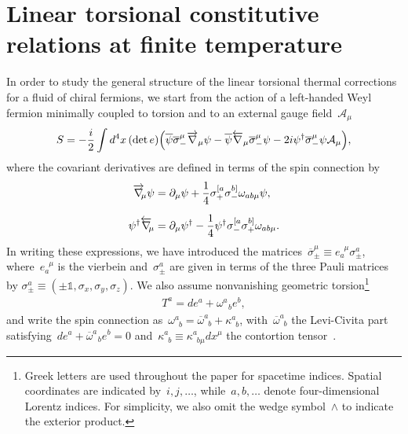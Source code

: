 \documentclass[11pt,a4paper]{article}
\begin{document}
\section{Linear torsional constitutive relations at finite temperature}
\label{sec:general_analysis}

In order to study the general structure of the linear torsional thermal corrections 
for a fluid of chiral fermions,
we start from the action of a left-handed Weyl fermion 
minimally coupled to torsion and to an external gauge field~$\mathcal{A}_{\mu}$~\cite{Freedman:2012zz}
\begin{align}
S=-{i\over 2}\int d^{4}x\,(\det{e})\Big(\overline{\psi}\overline{\sigma}_{-}^{\mu}
\overrightarrow{\nabla}_{\mu}\psi
-\overline{\psi}\overleftarrow{\nabla}_{\mu}\overline{\sigma}^{\mu}_{-}\psi
-2i\psi^{\dagger}\overline{\sigma}_{-}^{\mu}\psi\mathcal{A}_{\mu}\Big),
\label{eqw:action_full}
\end{align}
where the covariant derivatives are defined in terms of the spin connection by
\begin{align}
\overrightarrow{\nabla}_{\!\!\mu}\psi&=\partial_{\mu}\psi+{1\over 4}
\sigma_{+}^{[a}\sigma_{-}^{b]}\omega_{ab\mu}\psi,\nonumber \\[0.2cm]
\psi^{\dagger}\overleftarrow{\nabla}_{\!\!\mu}&=\partial_{\mu}\psi^{\dagger}
-{1\over 4}\psi^{\dagger}\sigma_{-}^{[a}\sigma_{+}^{b]}\omega_{ab\mu}.
\label{eq:right_left_derivs}
\end{align}
In writing these expressions, we have introduced the 
matrices~$\overline{\sigma}^{\mu}_{\pm}\equiv e_{a}^{\,\,\,\mu}\sigma^{a}_{\pm}$, 
where~$e_{a}^{\,\,\,\mu}$ is the vierbein 
and~$\sigma_{\pm}^{a}$ are given in terms of the three Pauli matrices by
$\sigma_{\pm}^{a}\equiv(\pm\mathbb{1},\sigma_{x},\sigma_{y},\sigma_{z})$. 
We also assume nonvanishing geometric torsion\footnote{Greek letters are used throughout the 
paper for spacetime indices. Spatial coordinates are indicated by~$i,j,\ldots$, while~$a,b,\ldots$
denote four-dimensional Lorentz indices.  For simplicity, we
also omit the wedge symbol~$\wedge$ to indicate the exterior product.} 
\begin{align}
T^{a}=de^{a}+\omega^{a}_{\,\,\,\,b}e^{b},
\label{eq:torsion_two_form}
\end{align}
and write the 
spin connection as~$\omega^{a}_{\,\,\,b}
=\overline{\omega}^{a}_{\,\,\,b}+\kappa^{a}_{\,\,\,b}$, with~$\overline{\omega}^{a}_{\,\,\,b}$ 
the Levi-Civita part 
satisfying~$de^{a}+\overline{\omega}^{a}_{\,\,\,\,b}
e^{b}=0$ and~$\kappa^{a}_{\,\,\,b}\equiv \kappa^{a}_{\,\,\,b\mu}dx^{\mu}$ the contortion tensor~\cite{Hehl:1976kj,Freedman:2012zz}. 
\end{document}
